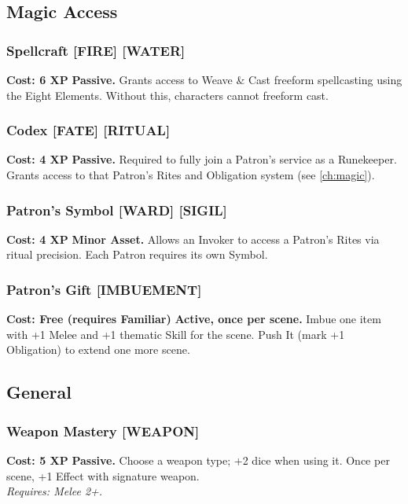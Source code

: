 \subsection*{Magic Access}
\label{sec:major-magic-access}

\subsubsection*{Spellcraft \textnormal{[FIRE] [WATER]}}
\label{talent:spellcraft-major}
\textbf{Cost: 6 XP} \textbf{Passive.} Grants access to Weave \& Cast freeform spellcasting using the Eight Elements. Without this, characters cannot freeform cast.

\subsubsection*{Codex \textnormal{[FATE] [RITUAL]}}
\label{talent:codex}
\textbf{Cost: 4 XP} \textbf{Passive.} Required to fully join a Patron's service as a Runekeeper. Grants access to that Patron's Rites and Obligation system (see \ref{ch:magic}).

\subsubsection*{Patron's Symbol \textnormal{[WARD] [SIGIL]}}
\label{talent:patrons-symbol}
\textbf{Cost: 4 XP} \textbf{Minor Asset.} Allows an Invoker to access a Patron's Rites via ritual precision. Each Patron requires its own Symbol.

\subsubsection*{Patron's Gift \textnormal{[IMBUEMENT]}}
\label{talent:patrons-gift}
\textbf{Cost: Free (requires Familiar)} \textbf{Active, once per scene.} Imbue one item with +1 Melee and +1 thematic Skill for the scene. Push It (mark +1 Obligation) to extend one more scene.

\subsection*{General}
\label{sec:major-general}

\subsubsection*{Weapon Mastery \textnormal{[WEAPON]}}
\label{talent:weapon-mastery}
\textbf{Cost: 5 XP} \textbf{Passive.} Choose a weapon type; +2 dice when using it. Once per scene, +1 Effect with signature weapon. \\
\textit{Requires: Melee 2+.}

